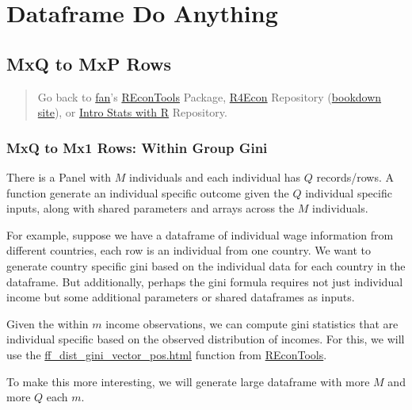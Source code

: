 \documentclass[
]{book}
\begin{document}
\hypertarget{dataframe-do-anything}{%
\section{Dataframe Do Anything}\label{dataframe-do-anything}}

\hypertarget{mxq-to-mxp-rows}{%
\subsection{MxQ to MxP Rows}\label{mxq-to-mxp-rows}}

\begin{quote}
Go back to \href{http://fanwangecon.github.io/}{fan}'s \href{https://fanwangecon.github.io/REconTools/}{REconTools} Package, \href{https://fanwangecon.github.io/R4Econ/}{R4Econ} Repository (\href{https://fanwangecon.github.io/R4Econ/bookdown}{bookdown site}), or \href{https://fanwangecon.github.io/Stat4Econ/}{Intro Stats with R} Repository.
\end{quote}

\hypertarget{mxq-to-mx1-rows-within-group-gini}{%
\subsubsection{MxQ to Mx1 Rows: Within Group Gini}\label{mxq-to-mx1-rows-within-group-gini}}

There is a Panel with \(M\) individuals and each individual has \(Q\) records/rows. A function generate an individual specific outcome given the \(Q\) individual specific inputs, along with shared parameters and arrays across the \(M\) individuals.

For example, suppose we have a dataframe of individual wage information from different countries, each row is an individual from one country. We want to generate country specific gini based on the individual data for each country in the dataframe. But additionally, perhaps the gini formula requires not just individual income but some additional parameters or shared dataframes as inputs.

Given the within \(m\) income observations, we can compute gini statistics that are individual specific based on the observed distribution of incomes. For this, we will use the \href{https://fanwangecon.github.io/REconTools/reference/ff_dist_gini_vector_pos.html}{ff\_dist\_gini\_vector\_pos.html} function from \href{https://fanwangecon.github.io/REconTools/}{REconTools}.

To make this more interesting, we will generate large dataframe with more \(M\) and more \(Q\) each \(m\).
\end{document}
